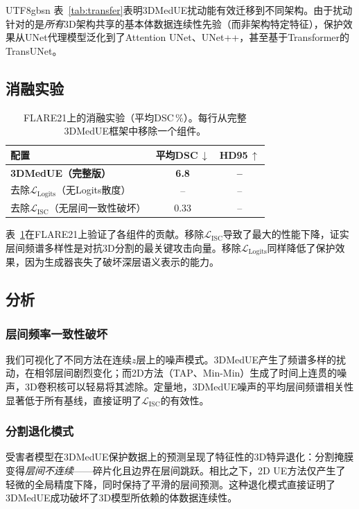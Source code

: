 \documentclass[a4paper,11pt]{article}
\begin{document}
\begin{CJK}{UTF8}{gbsn}
表~\ref{tab:transfer}表明3DMedUE扰动能有效迁移到不同架构。由于扰动针对的是\textit{所有}3D架构共享的基本体数据连续性先验（而非架构特定特征），保护效果从UNet代理模型泛化到了Attention UNet、UNet++，甚至基于Transformer的TransUNet。

\subsection{消融实验}

\begin{table}[t]
\centering
\caption{FLARE21上的消融实验（平均DSC\,\%）。每行从完整3DMedUE框架中移除一个组件。}\label{tab:ablation}
\setlength{\tabcolsep}{6pt}
\begin{tabular}{lcc}
\toprule
配置 & 平均DSC\,$\downarrow$ & HD95\,$\uparrow$ \\
\midrule
\textbf{3DMedUE（完整版）} & \textbf{6.8} & \textbf{--} \\
\midrule
去除$\mathcal{L}_{\text{Logits}}$（无Logits散度） & -- & -- \\
去除$\mathcal{L}_{\text{ISC}}$（无层间一致性破坏） & 0.33 & -- \\
\bottomrule
\end{tabular}
\end{table}

表~\ref{tab:ablation}在FLARE21上验证了各组件的贡献。移除$\mathcal{L}_{\text{ISC}}$导致了最大的性能下降，证实层间频谱多样性是对抗3D分割的最关键攻击向量。移除$\mathcal{L}_{\text{Logits}}$同样降低了保护效果，因为生成器丧失了破坏深层语义表示的能力。
\subsection{分析}

\subsubsection{层间频率一致性破坏}
我们可视化了不同方法在连续$z$层上的噪声模式。3DMedUE产生了频谱多样的扰动，在相邻层间剧烈变化；而2D方法（TAP、Min-Min）生成了时间上连贯的噪声，3D卷积核可以轻易将其滤除。定量地，3DMedUE噪声的平均层间频谱相关性显著低于所有基线，直接证明了$\mathcal{L}_{\text{ISC}}$的有效性。

\subsubsection{分割退化模式}
受害者模型在3DMedUE保护数据上的预测呈现了特征性的3D特异退化：分割掩膜变得\textit{层间不连续}——碎片化且边界在层间跳跃。相比之下，2D UE方法仅产生了轻微的全局精度下降，同时保持了平滑的层间预测。这种退化模式直接证明了3DMedUE成功破坏了3D模型所依赖的体数据连续性。


\end{CJK}
\end{document}

